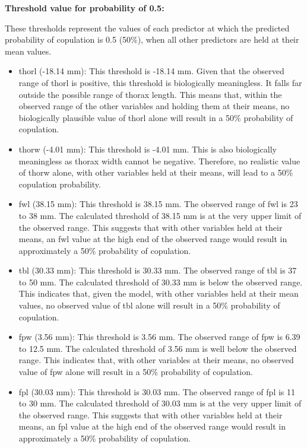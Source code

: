 \documentclass[
]{article}
\begin{document}
\textbf{Threshold value for probability of 0.5:}

These thresholds represent the values of each predictor at which the
predicted probability of copulation is 0.5 (50\%), when all other
predictors are held at their mean values.

\begin{itemize}
\item
  thorl (-18.14 mm): This threshold is -18.14 mm. Given that the
  observed range of thorl is positive, this threshold is biologically
  meaningless. It falls far outside the possible range of thorax length.
  This means that, within the observed range of the other variables and
  holding them at their means, no biologically plausible value of thorl
  alone will result in a 50\% probability of copulation.
\item
  thorw (-4.01 mm): This threshold is -4.01 mm. This is also
  biologically meaningless as thorax width cannot be negative.
  Therefore, no realistic value of thorw alone, with other variables
  held at their means, will lead to a 50\% copulation probability.
\item
  fwl (38.15 mm): This threshold is 38.15 mm. The observed range of fwl
  is 23 to 38 mm. The calculated threshold of 38.15 mm is at the very
  upper limit of the observed range. This suggests that with other
  variables held at their means, an fwl value at the high end of the
  observed range would result in approximately a 50\% probability of
  copulation.
\item
  tbl (30.33 mm): This threshold is 30.33 mm. The observed range of tbl
  is 37 to 50 mm. The calculated threshold of 30.33 mm is below the
  observed range. This indicates that, given the model, with other
  variables held at their mean values, no observed value of tbl alone
  will result in a 50\% probability of copulation.
\item
  fpw (3.56 mm): This threshold is 3.56 mm. The observed range of fpw is
  6.39 to 12.5 mm. The calculated threshold of 3.56 mm is well below the
  observed range. This indicates that, with other variables at their
  means, no observed value of fpw alone will result in a 50\%
  probability of copulation.
\item
  fpl (30.03 mm): This threshold is 30.03 mm. The observed range of fpl
  is 11 to 30 mm. The calculated threshold of 30.03 mm is at the very
  upper limit of the observed range. This suggests that with other
  variables held at their means, an fpl value at the high end of the
  observed range would result in approximately a 50\% probability of
  copulation.
\end{itemize}
\end{document}
